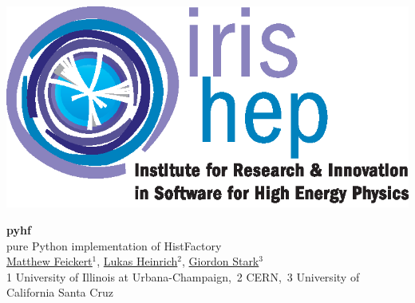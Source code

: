 \documentclass[princeton,portrait]{a0poster}
\newlength{\marginoffset}
\begin{document}
%
%
%
\begin{minipage}[b]{\linewidth}
 \hspace{-\marginoffset}
 \begin{minipage}{0.25\linewidth}
  \href{https://iris-hep.org/}{\includegraphics[width=\linewidth]{IRIS-HEP_logo.eps}}
 \end{minipage}%
 \quad
 \begin{minipage}{0.54\linewidth}
  \VERYHuge \color{Black} \textbf{pyhf}\\[0.5cm] \color{Black}\Huge{pure Python implementation of HistFactory}\\[1cm] %
  \color{DarkSlateGray} %
  \LARGE {\href{https://www.matthewfeickert.com/}{\underline{Matthew Feickert}$^{1}$}}, \href{http://www.lukasheinrich.com/}{Lukas Heinrich$^{2}$}, \href{https://giordonstark.com/}{Giordon Stark$^{3}$}\\[0.5cm] %
  \normalsize {1 University of Illinois at Urbana-Champaign,~2 CERN,~3 University of California Santa Cruz}\\[1cm]%
  \color{Black}
 \end{minipage}
 \begin{minipage}{0.18\linewidth}

\end{minipage}
\end{minipage}
\end{document}
